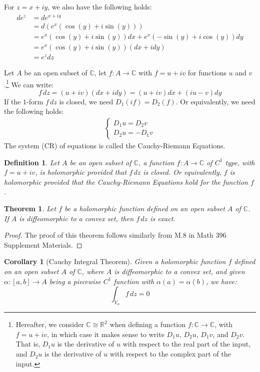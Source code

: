 \documentclass[11pt,oneside]{book}
\theoremstyle{break}
\theoremstyle{break}
\newtheorem{thm}{Theorem}[section]
\newtheorem{corT}[lem]{Corollary}
\newtheorem{defn}{Definition}[corL]
\newcommand{\R}{\mathbb{R}}
\newcommand{\Complex}{\mathbb{C}}
\begin{document}
For $z=x+iy$, we also have the following holds:
\begin{align*}
de^z &= de^{x+iy}\\
&= d(e^x(\cos(y)+i\sin(y))) \\
&= e^x(\cos(y)+i\sin(y))dx + e^x(-\sin(y)+i\cos(y))dy \\
&= e^x(\cos(y) + i\sin(y)) (dx+idy)\\
&= e^z dz
\end{align*}

Let $A$ be an open subset of $\Complex$, let $f:A \to \Complex$ with $f = u+iv$ for functions $u$ and $v$.\footnote{Hereafter, we consider $\Complex \cong \R^2$ when defining a function $f:\Complex\to\Complex$, with $f=u+iv$, in which case it makes sense to write $D_1u$, $D_2u$, $D_1v$, and $D_2 v$. That is, $D_1u$ is the derivative of $u$ with respect to the real part of the input, and $D_2u$ is the derivative of $u$ with respect to the complex part of the input.} We can write:
$$f\, dz = (u+iv)(dx+idy) = (u+iv)dx+(iu-v) dy$$
If the $1$-form $f\, dz$ is closed, we need $D_1(if) = D_2(f)$. Or equivalently, we need the following holds:
\begin{align*}
\begin{cases}
D_1 u = D_2 v\\
D_2 u = -D_1 v
\end{cases}
\tag{CR}
\end{align*}
The system (CR) of equations is called the Cauchy-Riemann Equations.

\begin{defn}
Let $A$ be an open subset of $\Complex$, a function $f:A \to \Complex$ of $C^1$ type, with $f = u+iv$, is holomorphic provided that $f\, dz$ is closed. Or equivalently, $f$ is holomorphic provided that the Cauchy-Riemann Equations hold for the function $f$. 
\end{defn}


\begin{thm}
Let $f$ be a holomorphic function defined on an open subset $A$ of $\Complex$. \\
If $A$ is diffeomorphic to a convex set, then $f\, dz$ is exact.
\end{thm}
\begin{proof}
The proof of this theorem follows similarly from M.8 in Math 396 Supplement Materials.
\end{proof}

\begin{corT}[Cauchy Integral Theorem]
Given a holomorphic function $f$ defined on an open subset $A$ of $\Complex$, where $A$ is diffeomorphic to a convex set, and given $\alpha:[a,b] \to A$ being a piecewise $C^1$ function with $\alpha(a) = \alpha(b)$, we have: $$\int_{Y_\alpha} f\, dz = 0$$
\end{corT}
\end{document}
